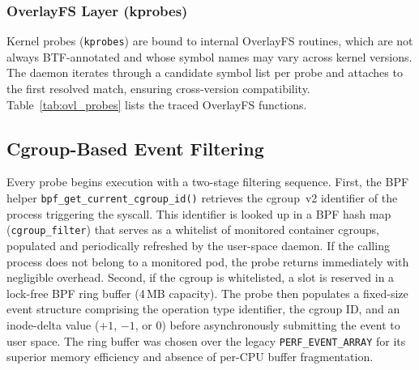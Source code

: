 \documentclass[conference]{IEEEtran}
\begin{document}
\subsubsection{OverlayFS Layer (kprobes)}
Kernel probes (\texttt{kprobes}) are bound to internal OverlayFS routines, which are not always BTF-annotated and whose symbol names may vary across kernel versions. The daemon iterates through a candidate symbol list per probe and attaches to the first resolved match, ensuring cross-version compatibility. Table~\ref{tab:ovl_probes} lists the traced OverlayFS functions.

\begin{table}[t]
\centering
\caption{OverlayFS-layer probes attached via \texttt{kprobe}.}
\label{tab:ovl_probes}
\small
{}
\end{table}

\subsection{Cgroup-Based Event Filtering}
\label{subsec:filtering}

Every probe begins execution with a two-stage filtering sequence. First, the BPF helper \texttt{bpf\_get\_current\_cgroup\_id()} retrieves the cgroup~v2 identifier of the process triggering the syscall. This identifier is looked up in a BPF hash map (\texttt{cgroup\_filter}) that serves as a whitelist of monitored container cgroups, populated and periodically refreshed by the user-space daemon. If the calling process does not belong to a monitored pod, the probe returns immediately with negligible overhead. Second, if the cgroup is whitelisted, a slot is reserved in a lock-free BPF ring buffer (4\,MB capacity). The probe then populates a fixed-size event structure comprising the operation type identifier, the cgroup ID, and an inode-delta value ($+1$, $-1$, or $0$) before asynchronously submitting the event to user space. The ring buffer was chosen over the legacy \texttt{PERF\_EVENT\_ARRAY} for its superior memory efficiency and absence of per-CPU buffer fragmentation.
\end{document}
